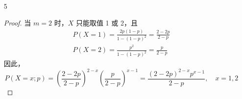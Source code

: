 \documentclass[normal,cn]{elegantnote}
\begin{document}
\begin{enumerate}
\begin{proof}
\begin{enumerate}
                      故 $\theta$ 的最大似然估计为 $\hat{\theta}$ 是 $\left(X_{(n)}-\frac{1}{2},X_{(1)}+\frac{1}{2}\right)$ 中任何一个值。
                \item
                      样本 $x_{1},x_{2},\ldots,x_{n}$ 的似然函数为
                      \begin{equation*}
                          \begin{aligned}
                              L\left(\theta_{1},\theta_{2}\right)= & \prod_{i=1}^{n}\frac{1}{\theta_{2}-\theta_{1}}\mathrm{I}_{\theta_{1}<x_{i}<\theta_{2}}                      \\
                              =                                    & \frac{1}{\left(\theta_{2}-\theta_{1}\right)^{n}}\mathrm{I}_{\theta_{1}<x_{1},x_{2},\ldots,x_{n}<\theta_{2}}
                          \end{aligned}
                      \end{equation*}

                      显然 $\theta_{1}$ 越大且 $\theta_{2}$ 越小时， $\frac{1}{\left(\theta_{2}-\theta_{1}\right)^{n}}$ 越大，且由于示性函数的限制，仅当 $\theta_{1}<x_{1},x_{2},\ldots,x_{n}<\theta_{2}$ 时，$L\left(\theta_{1},\theta_{2}\right)>0$。因此，$\theta_{1}=\min\left\{x_{1},x_{2},\ldots,x_{n}\right\}=x_{(1)},\theta_{2}=\max\left\{x_{1},x_{2},\ldots,x_{n}\right\}=x_{(n)}$ 时, $L\left(\theta_{1},\theta_{2}\right)$ 达到最大。

                      故 $\theta_{1}$ 的最大似然估计为 $\hat{\theta}_{1}=X_{(1)}$，$\theta_{2}$ 的最大似然估计为 $\hat{\theta}_{2}=X_{(n)}$。
            \end{enumerate}
        \end{proof}
    \item[5]
        \begin{proof}
            当 $m=2$ 时，$X$ 只能取值 1 或 2，且
            \begin{gather*}
                P\left(X=1\right)=\frac{2p(1-p)}{1-(1-p)^{2}}=\frac{2-2p}{2-p} \\
                P\left(X=2\right)=\frac{p^{2}}{1-(1-p)^{2}}=\frac{p}{2-p}
            \end{gather*}
            因此，
            \begin{equation*}
                P\left(X=x;p\right)=\left(\frac{2-2p}{2-p}\right)^{2-x}\left(\frac{p}{2-p}\right)^{x-1}=\frac{(2-2p)^{2-x}p^{x-1}}{2-p},\quad x=1,2
            \end{equation*}


\end{proof}
\end{enumerate}
\end{document}
